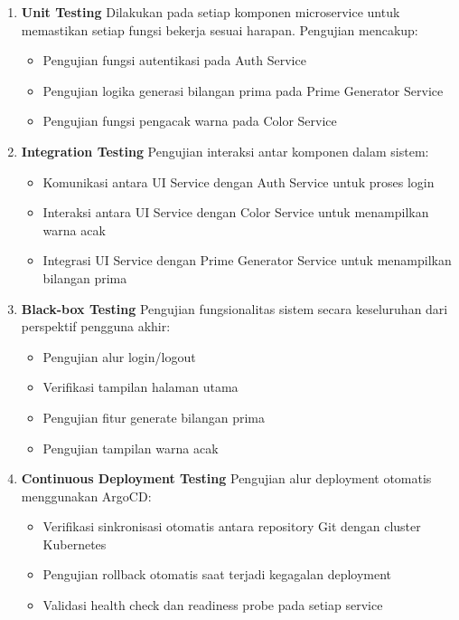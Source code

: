 \begin{enumerate}[label=\alph*.]
  \item \textbf{Unit Testing}\newline
        Dilakukan pada setiap komponen microservice untuk memastikan setiap fungsi bekerja sesuai harapan. Pengujian mencakup:
        \begin{itemize}
          \item Pengujian fungsi autentikasi pada Auth Service
          \item Pengujian logika generasi bilangan prima pada Prime Generator Service
          \item Pengujian fungsi pengacak warna pada Color Service
        \end{itemize}

  \item \textbf{Integration Testing}\newline
        Pengujian interaksi antar komponen dalam sistem:
        \begin{itemize}
          \item Komunikasi antara UI Service dengan Auth Service untuk proses login
          \item Interaksi antara UI Service dengan Color Service untuk menampilkan warna acak
          \item Integrasi UI Service dengan Prime Generator Service untuk menampilkan bilangan
                prima
        \end{itemize}

  \item \textbf{Black-box Testing}\newline
        Pengujian fungsionalitas sistem secara keseluruhan dari perspektif pengguna akhir:
        \begin{itemize}
          \item Pengujian alur login/logout
          \item Verifikasi tampilan halaman utama
          \item Pengujian fitur generate bilangan prima
          \item Pengujian tampilan warna acak
        \end{itemize}

  \item \textbf{Continuous Deployment Testing}\newline
        Pengujian alur deployment otomatis menggunakan ArgoCD:
        \begin{itemize}
          \item Verifikasi sinkronisasi otomatis antara repository Git dengan cluster
                Kubernetes
          \item Pengujian rollback otomatis saat terjadi kegagalan deployment
          \item Validasi health check dan readiness probe pada setiap service
        \end{itemize}
\end{enumerate}

